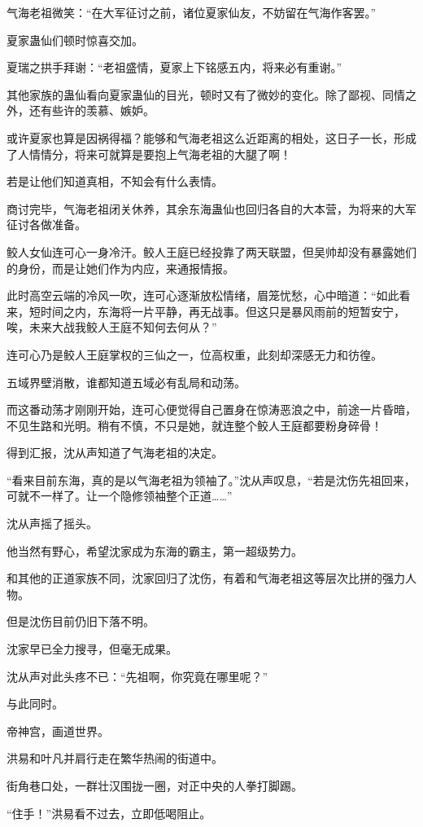 \begin{this_body}
气海老祖微笑：“在大军征讨之前，诸位夏家仙友，不妨留在气海作客罢。”

夏家蛊仙们顿时惊喜交加。

夏瑞之拱手拜谢：“老祖盛情，夏家上下铭感五内，将来必有重谢。”

其他家族的蛊仙看向夏家蛊仙的目光，顿时又有了微妙的变化。除了鄙视、同情之外，还有些许的羡慕、嫉妒。

或许夏家也算是因祸得福？能够和气海老祖这么近距离的相处，这日子一长，形成了人情情分，将来可就算是要抱上气海老祖的大腿了啊！

若是让他们知道真相，不知会有什么表情。

商讨完毕，气海老祖闭关休养，其余东海蛊仙也回归各自的大本营，为将来的大军征讨各做准备。

鲛人女仙连可心一身冷汗。鲛人王庭已经投靠了两天联盟，但吴帅却没有暴露她们的身份，而是让她们作为内应，来通报情报。

此时高空云端的冷风一吹，连可心逐渐放松情绪，眉笼忧愁，心中暗道：“如此看来，短时间之内，东海将一片平静，再无战事。但这只是暴风雨前的短暂安宁，唉，未来大战我鲛人王庭不知何去何从？”

连可心乃是鲛人王庭掌权的三仙之一，位高权重，此刻却深感无力和彷徨。

五域界壁消散，谁都知道五域必有乱局和动荡。

而这番动荡才刚刚开始，连可心便觉得自己置身在惊涛恶浪之中，前途一片昏暗，不见生路和光明。稍有不慎，不只是她，就连整个鲛人王庭都要粉身碎骨！

得到汇报，沈从声知道了气海老祖的决定。

“看来目前东海，真的是以气海老祖为领袖了。”沈从声叹息，“若是沈伤先祖回来，可就不一样了。让一个隐修领袖整个正道……”

沈从声摇了摇头。

他当然有野心，希望沈家成为东海的霸主，第一超级势力。

和其他的正道家族不同，沈家回归了沈伤，有着和气海老祖这等层次比拼的强力人物。

但是沈伤目前仍旧下落不明。

沈家早已全力搜寻，但毫无成果。

沈从声对此头疼不已：“先祖啊，你究竟在哪里呢？”

与此同时。

帝神宫，画道世界。

洪易和叶凡并肩行走在繁华热闹的街道中。

街角巷口处，一群壮汉围拢一圈，对正中央的人拳打脚踢。

“住手！”洪易看不过去，立即低喝阻止。


\end{this_body}
